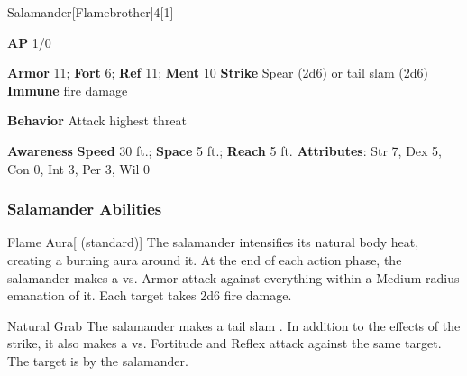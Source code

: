 \begin{monsection}{Salamander}[Flamebrother]{4}[1]
\vspace{-1em}\vspace{-1em}
\begin{spellcontent}
\begin{spelltargetinginfo}
{\textbf{AP} 1/0}

\pari \textbf{Armor} 11;
\textbf{Fort} 6;
\textbf{Ref} 11;
\textbf{Ment} 10
\pari \textbf{Strike} Spear  (2d6) or tail slam  (2d6)
\pari \textbf{Immune} fire damage


\pari \textbf{Behavior} Attack highest threat
\end{spelltargetinginfo}
\end{spellcontent}

\begin{monsterfooter}
\pari \textbf{Awareness} 
\pari \textbf{Speed} 30 ft.;
\textbf{Space} 5 ft.;
\textbf{Reach} 5 ft.
\pari \textbf{Attributes}:
Str 7,
Dex 5,
Con 0,
Int 3,
Per 3,
Wil 0
\end{monsterfooter}
\end{monsection}


\subsubsection{Salamander Abilities}

\begin{apability}{Flame Aura}[ (standard)]
The salamander intensifies its natural body heat, creating a burning aura around it.
At the end of each action phase, the salamander makes a  vs. Armor
attack against everything within a Medium radius emanation of it.
\hit Each target takes 2d6 fire damage.
\end{apability}

\vspace{0.5em}
\begin{freeability}{Natural Grab}
The salamander makes a tail slam .
In addition to the effects of the strike, it also makes a  vs. Fortitude and Reflex attack against the same target.
\hit The target is  by the salamander.
\end{freeability}

